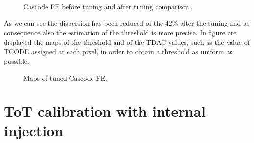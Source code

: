 \begin{figure}[h!]
\centering
{}\quad
{}\quad
{}\quad
\caption{Cascode FE before tuning and after tuning comparison.}
\label{fig:casc_tuning}
\end{figure}

As we can see the dispersion has been reduced of the 42\% after the tuning and as consequence also the estimation of the threshold is more precise. In figure  are displayed the maps of the threshold and of the TDAC values, such as the value of TCODE assigned at each pixel, in order to obtain a threshold as uniform as possible. \\

\begin{comment}
In more details, there are three step for tuning:

\begin{itemize}
\item launch a first threshold scan through the internal charge injection, with a TDAC value equal for all pixels (usually default value is TDAC= 4).
\item start a TDAC analysis which allows to choose a target threshold. During this phase, a tool tries to assign the optimized value of TDAC at each pixel in several steps, in order to get as close as possible to the set threshold. At the end it returns the final TDAC values for all selected pixels.
\item At last another scan is launched setting the TDAC of each pixel passing the TDAC map values obtained from the previous. 
\end{itemize}
\end{comment}

\begin{figure}[h!]
\centering
{}\quad
{}\quad
\caption{Maps of tuned Cascode FE.}
\label{fig:casc_maps_tune}
\end{figure}


\section{ToT calibration with internal injection}

